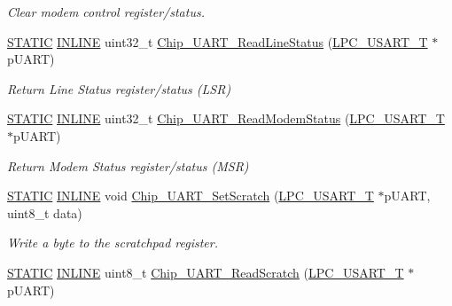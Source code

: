 \begin{DoxyCompactItemize}
\begin{DoxyCompactList}\small\item\em Clear modem control register/status. \end{DoxyCompactList}\item 
\hyperlink{group___l_p_c___types___public___macros_ga10b2d890d871e1489bb02b7e70d9bdfb}{S\+T\+A\+T\+IC} \hyperlink{spifi__18xx__43xx_8h_a2eb6f9e0395b47b8d5e3eeae4fe0c116}{I\+N\+L\+I\+NE} uint32\+\_\+t \hyperlink{group___u_a_r_t__18_x_x__43_x_x_gaf15ab7a9529d102b91760ed5587b279a}{Chip\+\_\+\+U\+A\+R\+T\+\_\+\+Read\+Line\+Status} (\hyperlink{struct_l_p_c___u_s_a_r_t___t}{L\+P\+C\+\_\+\+U\+S\+A\+R\+T\+\_\+T} $\ast$p\+U\+A\+RT)
\begin{DoxyCompactList}\small\item\em Return Line Status register/status (L\+SR) \end{DoxyCompactList}\item 
\hyperlink{group___l_p_c___types___public___macros_ga10b2d890d871e1489bb02b7e70d9bdfb}{S\+T\+A\+T\+IC} \hyperlink{spifi__18xx__43xx_8h_a2eb6f9e0395b47b8d5e3eeae4fe0c116}{I\+N\+L\+I\+NE} uint32\+\_\+t \hyperlink{group___u_a_r_t__18_x_x__43_x_x_gacd3d5239dec0378e52602633c183e942}{Chip\+\_\+\+U\+A\+R\+T\+\_\+\+Read\+Modem\+Status} (\hyperlink{struct_l_p_c___u_s_a_r_t___t}{L\+P\+C\+\_\+\+U\+S\+A\+R\+T\+\_\+T} $\ast$p\+U\+A\+RT)
\begin{DoxyCompactList}\small\item\em Return Modem Status register/status (M\+SR) \end{DoxyCompactList}\item 
\hyperlink{group___l_p_c___types___public___macros_ga10b2d890d871e1489bb02b7e70d9bdfb}{S\+T\+A\+T\+IC} \hyperlink{spifi__18xx__43xx_8h_a2eb6f9e0395b47b8d5e3eeae4fe0c116}{I\+N\+L\+I\+NE} void \hyperlink{group___u_a_r_t__18_x_x__43_x_x_ga67cb62756a430156bc754a57c72372bd}{Chip\+\_\+\+U\+A\+R\+T\+\_\+\+Set\+Scratch} (\hyperlink{struct_l_p_c___u_s_a_r_t___t}{L\+P\+C\+\_\+\+U\+S\+A\+R\+T\+\_\+T} $\ast$p\+U\+A\+RT, uint8\+\_\+t data)
\begin{DoxyCompactList}\small\item\em Write a byte to the scratchpad register. \end{DoxyCompactList}\item 
\hyperlink{group___l_p_c___types___public___macros_ga10b2d890d871e1489bb02b7e70d9bdfb}{S\+T\+A\+T\+IC} \hyperlink{spifi__18xx__43xx_8h_a2eb6f9e0395b47b8d5e3eeae4fe0c116}{I\+N\+L\+I\+NE} uint8\+\_\+t \hyperlink{group___u_a_r_t__18_x_x__43_x_x_gafa7b67254c1f19bb0b085736049d9879}{Chip\+\_\+\+U\+A\+R\+T\+\_\+\+Read\+Scratch} (\hyperlink{struct_l_p_c___u_s_a_r_t___t}{L\+P\+C\+\_\+\+U\+S\+A\+R\+T\+\_\+T} $\ast$p\+U\+A\+RT)

\end{DoxyCompactItemize}
